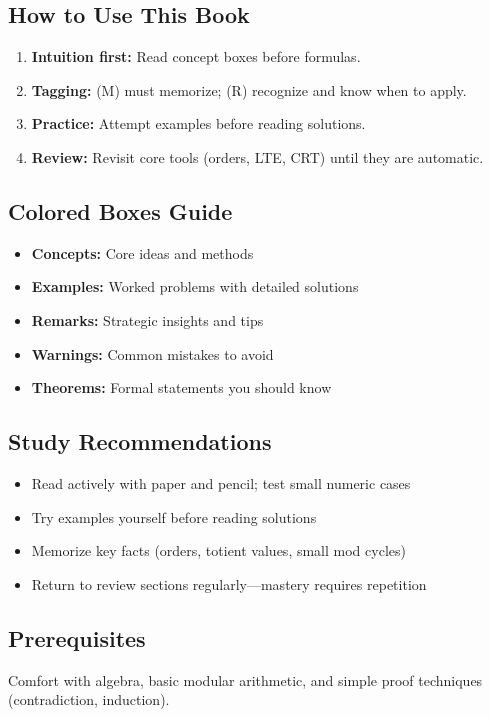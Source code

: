 \documentclass[12pt]{extarticle}
\begin{document}
\subsection*{How to Use This Book}
\begin{enumerate}
    \item \textbf{Intuition first:} Read concept boxes before formulas.
    \item \textbf{Tagging:} (M) must memorize; (R) recognize and know when to apply.
    \item \textbf{Practice:} Attempt examples before reading solutions.
    \item \textbf{Review:} Revisit core tools (orders, LTE, CRT) until they are automatic.
\end{enumerate}

\subsection*{Colored Boxes Guide}
\begin{itemize}
    \item \textcolor{blue!75!black}{\textbf{Concepts:}} Core ideas and methods
    \item \textcolor{orange!75!black}{\textbf{Examples:}} Worked problems with detailed solutions
    \item \textcolor{green!60!black}{\textbf{Remarks:}} Strategic insights and tips
    \item \textcolor{red!75!black}{\textbf{Warnings:}} Common mistakes to avoid
    \item \textcolor{purple!75!black}{\textbf{Theorems:}} Formal statements you should know
\end{itemize}

\subsection*{Study Recommendations}
\begin{itemize}
    \item Read actively with paper and pencil; test small numeric cases
    \item Try examples yourself before reading solutions
    \item Memorize key facts (orders, totient values, small mod cycles)
    \item Return to review sections regularly—mastery requires repetition
\end{itemize}

\subsection*{Prerequisites}
Comfort with algebra, basic modular arithmetic, and simple proof techniques (contradiction, induction).
\end{document}

